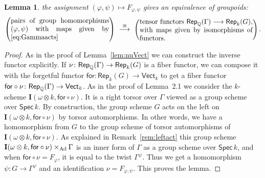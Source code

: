 \documentclass[twoside,leqno]{article}
\numberwithin{equation}{section}
\theoremstyle{plain}
\newtheorem{lemma}[equation]{Lemma}
\theoremstyle{definition}
\begin{document}
\begin{lemma} \label{lem:nuRep}
the assignment $(\varphi,\psi) \mapsto
F_{\varphi,\psi}$ gives an equivalence of groupoids:
\[
\left(\text{\begin{minipage}[c]{2in} pairs
  of group homomorphisms $(\varphi,\psi)$
  with maps given by \eqref{eq:Gammaacts}\end{minipage}}\right) \
\stackrel{\cong}{\longrightarrow} \  \left(\text{\begin{minipage}[c]{2.3in} tensor
functors $\mathsf{Rep}_{\bbQ}(\Gamma) \longrightarrow
\mathsf{Rep}_{k}(G)$, with maps given by isomorphisms of functors.
\end{minipage}}\right).
\]
\end{lemma}
\begin{proof}
As in the proof of Lemma~\ref{lem:nuVect} we can construct the
 inverse functor explicitly. If \linebreak 
 $\nu \colon \mathsf{Rep}_{\mathbb Q}(\Gamma) \to
 \mathsf{Rep}_{k}(G)$ is a fiber functor, we can compose it with the
 forgetful functor \linebreak $\mathsf{for} \colon \mathsf{Rep}_{k}(G) \to
 \mathsf{Vect}_{k}$ to get a fiber functor $\mathsf{for}\circ\nu \colon
 \mathsf{Rep}_{\mathbb Q}(\Gamma) \to \mathsf{Vect}_{k}$. As in the proof
 of Lemma~2.1 we consider the $k$-scheme $\mathbf{I}(\omega\otimes
 k,\mathsf{for}\circ \nu)$. It is a right torsor over $\Gamma$ viewed
 as a group scheme over $\mathsf{Spec}\, k$.  By construction, the
 group scheme $G$ acts on the left on $\mathbf{I}(\omega\otimes
 k,\mathsf{for}\circ \nu)$ by torsor automorphisms. In other words,
 we have a homomorphism from $G$ to the group scheme of torsor
 automorphisms of $\mathbf{I}(\omega\otimes k,\mathsf{for}\circ
 \nu)$. As explained in Remark~\ref{rem:leftact} this group scheme
 $\mathbf{I}(\omega\otimes k,\mathsf{for}\circ \nu)\times_{\operatorname{Ad}}
 \Gamma$ is an inner form of $\Gamma$ as a group scheme over
 $\mathsf{Spec}\, k$, and when $\mathsf{for}\circ \nu = F_{\varphi}$,
 it is equal to the twist $\Gamma^{\varphi}$. Thus we get a
 homomorphism $\psi \colon G \to \Gamma^{\varphi}$ and an identification
 $\nu = F_{\varphi,\psi}$. This proves the lemma.
\end{proof}
\end{document}
